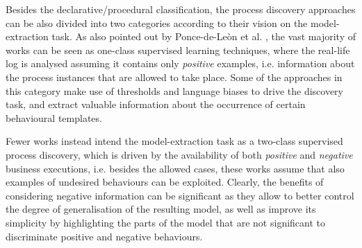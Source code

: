 Besides the declarative/procedural classification, the process discovery approaches can be also divided into two categories according to their vision on the model-extraction task. 
As also pointed out by Ponce-de-Le\`on et al. \cite{2018-Ponce}, the vast majority of works %
can be seen as one-class supervised learning techniques, where the real-life log is analysed assuming it contains only \emph{positive} examples, i.e. information about the process instances that are allowed to take place. Some of the approaches in this category make use of thresholds and language biases to drive the discovery task, and extract valuable information about the occurrence of certain behavioural templates. 


Fewer works instead %
intend the model-extraction task as a two-class supervised process discovery, which is driven by the availability of both \emph{positive} and \emph{negative} business executions, i.e. besides the allowed cases, these works assume that also examples of undesired behaviours can be exploited. %
%
Clearly, the benefits of considering negative information can be significant as they allow to better control the degree of generalisation of the resulting model, as well as improve its simplicity by highlighting the parts of the model that are not significant to discriminate positive and negative behaviours. 


